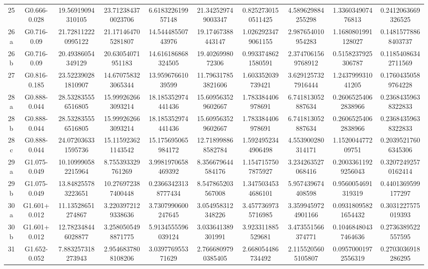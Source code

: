\begin{table}
\begin{tabular}{cccccccccc}
25 & G0.666-0.028 & 19.56919094310105 & 23.712384370023706 & 6.618322619957148 & 21.342529749003347 & 0.8252730150511425 & 4.589629884255298 & 1.336034907476813 & 0.2412063669326525 \\
26a & G0.716-0.09 & 21.728112220995122 & 21.171464705281807 & 14.54448550743976 & 19.17467388443147 & 1.0262923479061155 & 2.987654010954283 & 1.1680801991128027 & 0.14815778868403737 \\
26b & G0.716-0.09 & 20.49386054349129 & 20.63054071951183 & 14.616186868324505 & 19.4026998072306 & 0.9933748621580591 & 2.3747061569768912 & 0.5158237925306787 & 0.11854086342711569 \\
27 & G0.816-0.185 & 23.522390281810907 & 14.670758323065344 & 13.95967661039599 & 11.796317853821606 & 1.603352039739421 & 3.6291257327916444 & 1.243799931041205 & 0.17604350589764228 \\
28a & G0.888-0.044 & 28.532835556516805 & 15.999262663093214 & 18.185352974441436 & 15.609563529602667 & 1.783384406978691 & 6.741813052887634 & 0.26065254062838966 & 0.23684359638322833 \\
28b & G0.888-0.044 & 28.532835556516805 & 15.999262663093214 & 18.185352974441436 & 15.609563529602667 & 1.783384406978691 & 6.741813052887634 & 0.26065254062838966 & 0.23684359638322833 \\
28c & G0.888-0.044 & 24.072036331595736 & 15.115923621143542 & 15.175695065984172 & 12.718998868582784 & 1.5924952344906498 & 4.553900280314171 & 1.152004477209751 & 0.20395217606345306 \\
29a & G1.075-0.049 & 10.109990582215964 & 8.755393329761269 & 3.9981970658469392 & 8.356679644584176 & 1.1547157507875927 & 3.234263527068416 & 0.20033611929256043 & 0.32072492570162414 \\
29b & G1.075-0.049 & 13.848255783223651 & 10.276972387400448 & 0.23663423138777434 & 8.547865203567008 & 1.3475034534686101 & 5.957439674408598 & 0.9560054691319319 & 0.4401369599177297 \\
30a & G1.601+0.012 & 11.13528651274867 & 3.2203972129338636 & 3.7307990600247645 & 3.054958312348226 & 3.4577369735716985 & 3.3599459724901166 & 0.09318095821654432 & 0.3031227575019393 \\
30b & G1.601+0.012 & 12.782348446028877 & 3.2580505498871775 & 5.9134555596039124 & 3.033641389301991 & 3.923311885529681 & 3.473551566374771 & 0.10468480437464636 & 0.2736389522557595 \\
31 & G1.652-0.052 & 7.883257318273943 & 2.9546837808108206 & 3.039776955371629 & 2.7666809790385405 & 2.668054486734492 & 2.1155205605105807 & 0.09570001972556319 & 0.2703036918286295 \\
\end{tabular}
\end{table}
